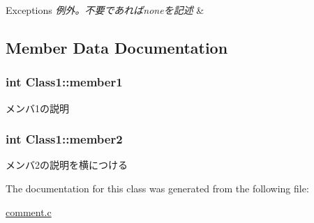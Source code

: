 \begin{DoxyExceptions}{Exceptions}
{\em 例外。不要であればnoneを記述} & \\
\hline
\end{DoxyExceptions}


\subsection{Member Data Documentation}
\hypertarget{classClass1_ab24aea43b371701c594cac3d29d49e3a}{
\subsubsection[{member1}]{\setlength{\rightskip}{0pt plus 5cm}int Class1\+::member1}}\label{classClass1_ab24aea43b371701c594cac3d29d49e3a}
メンバ1の説明 \hypertarget{classClass1_a21971b998fbe09a9c0578fa163b6192b}{
\subsubsection[{member2}]{\setlength{\rightskip}{0pt plus 5cm}int Class1\+::member2}}\label{classClass1_a21971b998fbe09a9c0578fa163b6192b}
メンバ2の説明を横につける 

The documentation for this class was generated from the following file\+:\begin{DoxyCompactItemize}
\item 
\hyperlink{comment_8c}{comment.\+c}\end{DoxyCompactItemize}
